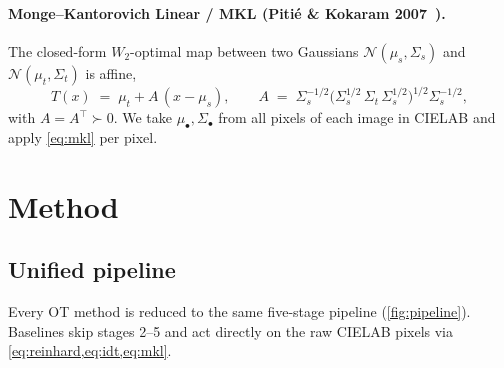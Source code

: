 \documentclass[11pt,a4paper]{article}
\newcommand{\Sig}{\Sigma}
\begin{document}
\paragraph{Monge--Kantorovich Linear / MKL (Piti\'e \& Kokaram 2007~\cite{pitie2007mkl}).}
The closed-form $W_2$-optimal map between two Gaussians
$\mathcal{N}(\mu_s, \Sig_s)$ and $\mathcal{N}(\mu_t, \Sig_t)$ is affine,
\begin{equation}
  \label{eq:mkl}
  T(x) \;=\; \mu_t + A\,(x - \mu_s),
  \qquad
  A \;=\; \Sig_s^{-1/2}
          \bigl(\Sig_s^{1/2}\, \Sig_t\, \Sig_s^{1/2}\bigr)^{1/2}
          \Sig_s^{-1/2},
\end{equation}
with $A = A^\top \succ 0$. We take $\mu_\bullet, \Sig_\bullet$ from all pixels of
each image in CIELAB and apply \cref{eq:mkl} per pixel.

\section{Method}
\label{sec:method}

\subsection{Unified pipeline}

Every OT method is reduced to the same five-stage pipeline
(\cref{fig:pipeline}). Baselines skip stages 2--5 and act directly on the raw
CIELAB pixels via \cref{eq:reinhard,eq:idt,eq:mkl}.
\end{document}
